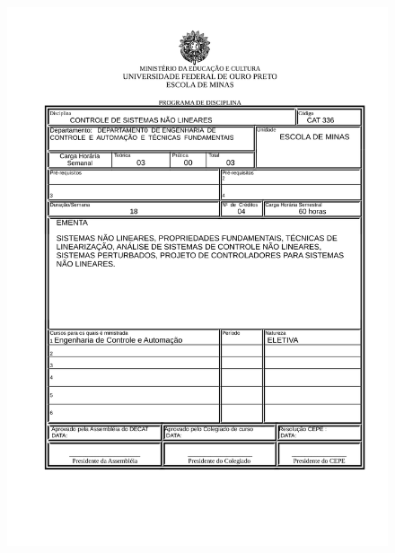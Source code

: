 \begin{figure}[p]
	\centering 
	\includegraphics[scale=0.7]{capitulos/anexo1-programas-disciplina/eg16.pdf}
\end{figure}


